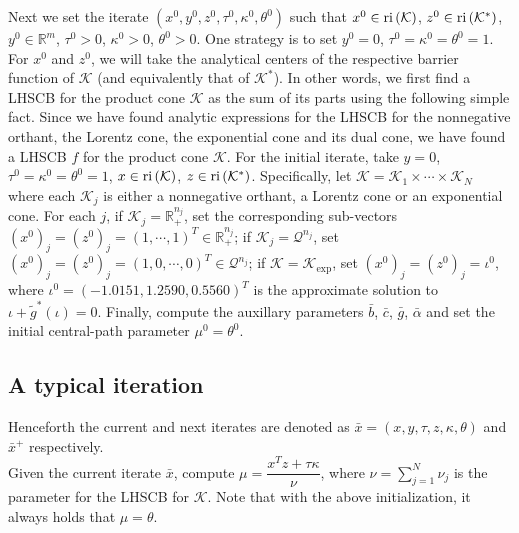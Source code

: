 \documentclass[10pt]{article}
\theoremstyle{definition}
\theoremstyle{plain}
\def\interior{\protect{\textnormal{ri}}}
\def\relint{\protect{\textnormal{ri}}}
\begin{document}
Next we set the iterate $(x^0,y^0, z^0, \tau^0, \kappa^0, \theta^0)$ such that $x^0 \in \interior\left(\mathcal{K}\right)$, $z^0 \in \interior\left(\mathcal{K}^*\right)$, $y^0 \in \mathbb{R}^m$, $\tau^0 > 0$, $\kappa^0 > 0$, $\theta^0>0$. One strategy is to set $y^0 = 0$, $\tau^0 = \kappa^0 = \theta^0 = 1$. For $x^0$ and $z^0$, we will take the analytical centers of the respective barrier function of $\mathcal{K}$ (and equivalently that of $\mathcal{K}^*$). In other words, we first find a LHSCB for the product cone $\mathcal{K}$ as the sum of its parts using the following simple fact.
Since we have found analytic expressions for the LHSCB for the nonnegative orthant, the Lorentz cone, the exponential cone and its dual cone, we have found a LHSCB $f$ for the product cone $\mathcal{K}$. For the initial iterate, take $y = 0$, $\tau^0 = \kappa^0 = \theta^0 = 1$, $x \in \relint \left(\mathcal{K}\right)$, $z\in\relint\left(\mathcal{K}^*\right)$. Specifically, let $\mathcal{K} = \mathcal{K}_1 \times \cdots \times \mathcal{K}_N$ where each $\mathcal{K}_j$ is either a nonnegative orthant, a Lorentz cone or an exponential cone. For each $j$, if $\mathcal{K}_j = \mathbb{R}_+^{n_j}$, set the corresponding sub-vectors $\left(x^0\right)_j = \left(z^0\right)_j = (1,\cdots, 1)^T \in \mathbb{R}_+^{n_j}$; if $\mathcal{K}_j = \mathcal{Q}^{n_j}$, set $\left(x^0\right)_j = \left(z^0\right)_j = (1,0,\cdots, 0)^T \in \mathcal{Q}^{n_j}$; if $\mathcal{K} = \mathcal{K}_{\exp}$, set $\left(x^0\right)_j = \left(z^0\right)_j = \iota^0$, where $\iota^0 =   (-1.0151, 1.2590, 0.5560)^T$ is the approximate solution to 
$\iota + \tilde g^*(\iota) = 0$. Finally, compute the auxillary parameters $\bar{b}$, $\bar{c}$, $\bar{g}$, $\bar{\alpha}$ and set the initial central-path parameter $\mu^0 = \theta^0$.

\subsection{A typical iteration}\label{A_typical_iteration}
Henceforth the current and next iterates are denoted as  $ \bar x = (x,y, \tau, z,\kappa, \theta)$ and  $ \bar x^+$ respectively. \\

Given the current iterate $\bar x$, compute $\mu = \dfrac{x^T z + \tau \kappa}{\nu}$, where $\nu = \sum_{j=1}^N \nu_j$ is the parameter for the LHSCB for $\mathcal{K}$. Note that with the above initialization, it always holds that $\mu = \theta$. \\
\end{document}
